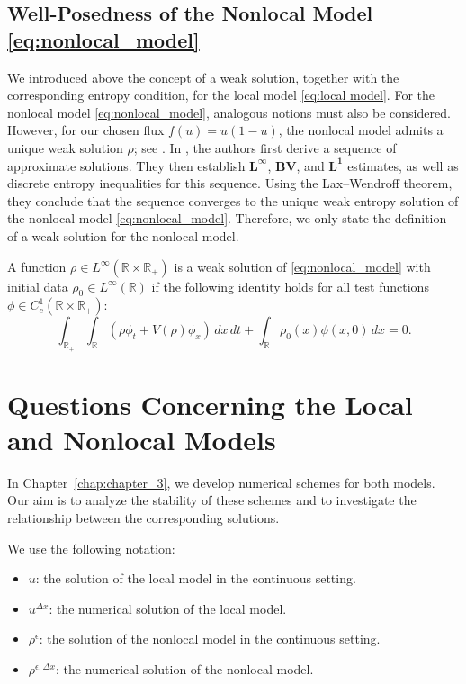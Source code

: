 \subsection{Well-Posedness of the Nonlocal Model \eqref{eq:nonlocal_model}}
We introduced above the concept of a weak solution, together with the corresponding entropy condition, for the local model \eqref{eq:local model}. For the nonlocal model \eqref{eq:nonlocal_model}, analogous notions must also be considered. However, for our chosen flux $f(u)=u(1-u)$, the nonlocal model admits a unique weak solution $\rho$; see \cite{blandinWellposednessConservationLaw2016,keimerExistenceUniquenessRegularity2017}. In \cite{blandinWellposednessConservationLaw2016}, the authors first derive a sequence of approximate solutions. They then establish $\mathbf{L^{\infty}}$, $\mathbf{BV}$, and $\mathbf{L^{1}}$ estimates, as well as discrete entropy inequalities for this sequence. Using the Lax--Wendroff theorem, they conclude that the sequence converges to the unique weak entropy solution of the nonlocal model \eqref{eq:nonlocal_model}. Therefore, we only state the definition of a weak solution for the nonlocal model.

\begin{definition}
    A function $\rho \in L^{\infty}(\mathbb{R} \times \mathbb{R}_{+})$ is a weak solution of \eqref{eq:nonlocal_model} with initial
    data $\rho_{0} \in L^{\infty}(\mathbb{R})$ if the following identity holds for all test functions $\phi \in C^{1}_{c}(\mathbb{R} \times \mathbb{R}_{+})$:
    \begin{equation}
        \int_{\mathbb{R}_{+}} \int_{\mathbb{R}}
        \left(
        \rho \phi_{t} + V(\rho) \phi_{x}
        \right) \,dx \, dt
        + \int_{\mathbb{R}} \rho_{0}(x) \phi(x,0) \,dx = 0.
    \end{equation}
\end{definition}
\section{Questions Concerning the Local and Nonlocal Models}

In Chapter~\ref{chap:chapter_3}, we develop numerical schemes for both models. Our aim is to analyze the stability of these schemes and to investigate the relationship between the corresponding solutions.

We use the following notation:
\begin{itemize}
    \item $u$: the solution of the local model in the continuous setting.
    \item $u^{\Delta x}$: the numerical solution of the local model.
    \item $\rho^{\epsilon}$: the solution of the nonlocal model in the continuous setting.
    \item $\rho^{\epsilon, \Delta x}$: the numerical solution of the nonlocal model.
\end{itemize}

